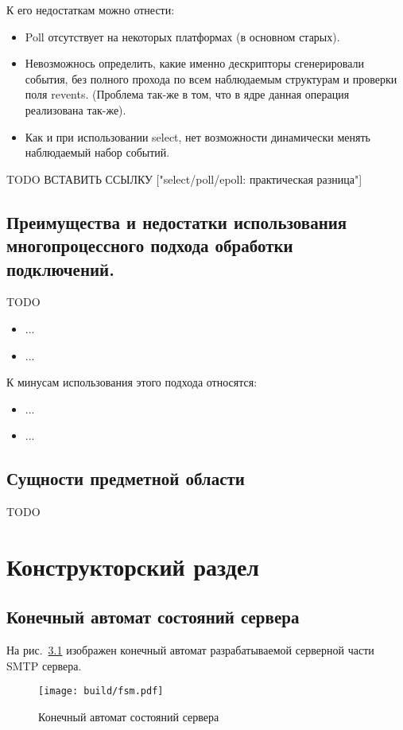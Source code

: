 \documentclass[a4paper,12pt]{report}
\begin{document}
К его недостаткам можно отнести:
\begin{itemize}
 	\item Poll отсутствует на некоторых платформах (в основном старых). 
	\item Невозможнось определить, какие именно дескрипторы сгенерировали события, без полного прохода по всем наблюдаемым структурам и проверки поля revents. (Проблема так-же в том, что в ядре данная операция реализована так-же). 
	\item Как и при использовании select, нет возможности динамически менять наблюдаемый набор событий. 
\end{itemize}

TODO ВСТАВИТЬ ССЫЛКУ ["select/poll/epoll: практическая разница"]

\section{Преимущества и недостатки использования многопроцессного подхода обработки подключений.}
TODO

\begin{itemize}
 	\item ...
	\item ...
\end{itemize}

К минусам использования этого подхода относятся:
\begin{itemize}
    \item ...
    \item ...
\end{itemize}


\section{Сущности предметной области}

TODO

\newpage
\chapter{Конструкторский раздел}

\section{Конечный автомат состояний сервера}

На рис.~\ref{fig:fsm} изображен конечный автомат разрабатываемой серверной части SMTP сервера. 

\begin{figure}[h]
	\centering
	\texttt{[image: build/fsm.pdf]}
	\caption{Конечный автомат состояний сервера}
	\label{fig:fsm}
\end{figure}
\end{document}
